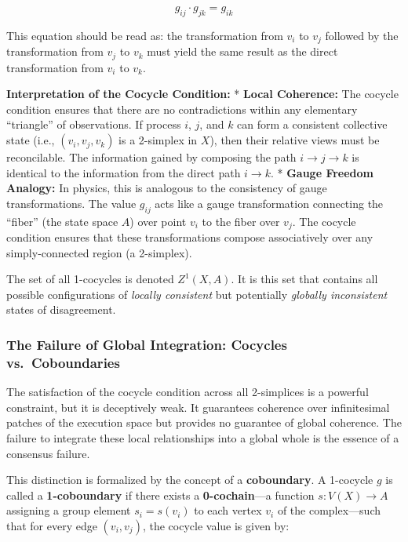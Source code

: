 \documentclass[
]{article}
\begin{document}
\[g_{ij} \cdot g_{jk} = g_{ik}\]

This equation should be read as: the transformation from \(v_i\) to
\(v_j\) followed by the transformation from \(v_j\) to \(v_k\) must
yield the same result as the direct transformation from \(v_i\) to
\(v_k\).

\textbf{Interpretation of the Cocycle Condition:} * \textbf{Local
Coherence:} The cocycle condition ensures that there are no
contradictions within any elementary ``triangle'' of observations. If
process \(i\), \(j\), and \(k\) can form a consistent collective state
(i.e., \((v_i, v_j, v_k)\) is a 2-simplex in \(X\)), then their relative
views must be reconcilable. The information gained by composing the path
\(i \to j \to k\) is identical to the information from the direct path
\(i \to k\). * \textbf{Gauge Freedom Analogy:} In physics, this is
analogous to the consistency of gauge transformations. The value
\(g_{ij}\) acts like a gauge transformation connecting the ``fiber''
(the state space \(A\)) over point \(v_i\) to the fiber over \(v_j\).
The cocycle condition ensures that these transformations compose
associatively over any simply-connected region (a 2-simplex).

The set of all 1-cocycles is denoted \(Z^1(X, A)\). It is this set that
contains all possible configurations of \emph{locally consistent} but
potentially \emph{globally inconsistent} states of disagreement.

\subsubsection{The Failure of Global Integration: Cocycles
vs.~Coboundaries}\label{the-failure-of-global-integration-cocycles-vs.-coboundaries}

The satisfaction of the cocycle condition across all 2-simplices is a
powerful constraint, but it is deceptively weak. It guarantees coherence
over infinitesimal patches of the execution space but provides no
guarantee of global coherence. The failure to integrate these local
relationships into a global whole is the essence of a consensus failure.

This distinction is formalized by the concept of a \textbf{coboundary}.
A 1-cocycle \(g\) is called a \textbf{1-coboundary} if there exists a
\textbf{0-cochain}---a function \(s: V(X) \to A\) assigning a group
element \(s_i = s(v_i)\) to each vertex \(v_i\) of the complex---such
that for every edge \((v_i, v_j)\), the cocycle value is given by:
\end{document}
